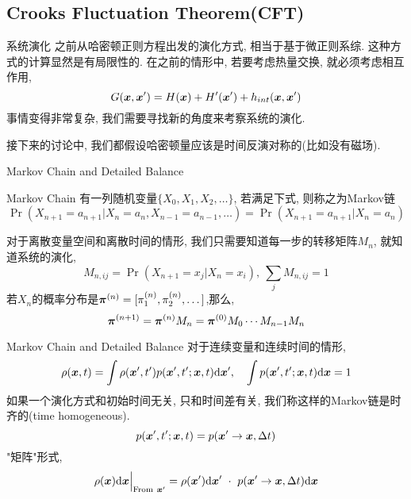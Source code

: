     \subsection{Crooks Fluctuation Theorem(CFT)}
    \begin{frame}{系统演化}
        之前从哈密顿正则方程出发的演化方式, 相当于基于微正则系综. 这种方式的计算显然是有局限性的. 在之前的情形中, 若要考虑热量交换, 就必须考虑相互作用,
        \begin{equation}
            G(\vb*x,\vb*x') = H(\vb*x) + H'(\vb*x') + h_{int}(\vb*x,\vb*x')        
        \end{equation}
        事情变得非常复杂, 我们需要寻找新的角度来考察系统的演化.

        接下来的讨论中, 我们都假设哈密顿量应该是时间反演对称的(比如没有磁场).
    \end{frame}
    \begin{frame}{Markov Chain and Detailed Balance}
        \begin{block}{Markov Chain}
            有一列随机变量$\{X_0,X_1,X_2,\dots\}$, 若满足下式, 则称之为Markov链
            \begin{equation}
                \Pr(X_{n+1}=a_{n+1} | X_{n} = a_n, X_{n-1} = a_{n-1},\dots) = \Pr(X_{n+1}=a_{n+1} | X_{n} = a_n)
            \end{equation}
        \end{block}
        对于离散变量空间和离散时间的情形, 我们只需要知道每一步的转移矩阵$M_n$, 就知道系统的演化,
        \begin{equation}
            M_{n,ij} = \Pr(X_{n+1} = x_j| X_n = x_i),\ \sum_j M_{n,ij} = 1
        \end{equation}
        若$X_n$的概率分布是$\vb*\pi^{(n)} = [\pi^{(n)}_1,\pi^{(n)}_2,\dots]$,那么,
        \begin{equation}
            \vb*\pi^{(n+1)} = \vb*\pi^{(n)}M_n = \vb*\pi^{(0)}M_0\cdots M_{n-1}M_{n}
        \end{equation}
    \end{frame}
    \begin{frame}{Markov Chain and Detailed Balance}
        对于连续变量和连续时间的情形,
        \begin{equation}
            \rho(\vb*x, t) = \int  \rho(\vb*x', t')p(\vb*x',t'; \vb*x, t)\dd\vb*x', \quad \int p(\vb*x',t'; \vb*x, t) \dd\vb*x = 1
        \end{equation}
        如果一个演化方式和初始时间无关, 只和时间差有关, 我们称这样的Markov链是时齐的(time homogeneous).
        \begin{equation}
            p(\vb*x',t'; \vb*x,t) = p(\vb*x'\to\vb*x, \Delta t)
        \end{equation}
        "矩阵"形式,
        \begin{equation}
            \rho(\vb*x)\dd\vb*x\Big|_{\text{From}\ \vb*x'} = \rho(\vb*x')\dd\vb*x'\ \cdot\ p(\vb*x'\to\vb*x, \Delta t)\dd\vb*x
        \end{equation}
    \end{frame}
